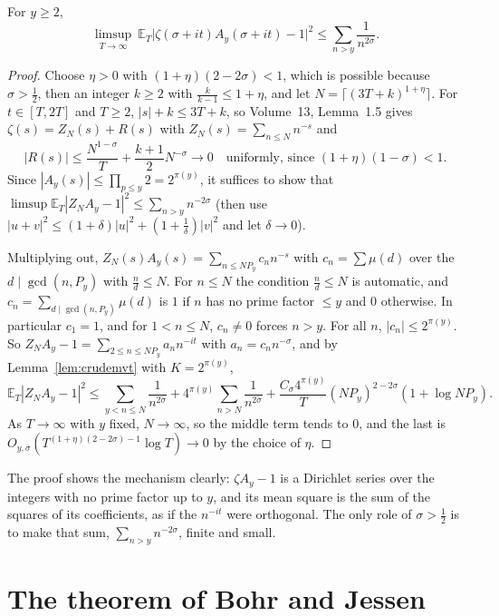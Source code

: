 \begin{proposition}\label{prop:mollified}
For $y\ge2$,
\[
\limsup_{T\to\infty}\ \mathbb E_T\bigl|\zeta(\sigma+it)A_y(\sigma+it)-1\bigr|^2\le\sum_{n>y}\frac1{n^{2\sigma}}.
\]
\end{proposition}
\begin{proof}
Choose $\eta>0$ with $(1+\eta)(2-2\sigma)<1$, which is possible because $\sigma>\frac12$, then an integer $k\ge2$ with $\frac k{k-1}\le1+\eta$, and let $N=\lceil(3T+k)^{1+\eta}\rceil$. For $t\in[T,2T]$ and $T\ge2$, $|s|+k\le3T+k$, so Volume~13, Lemma~1.5 gives $\zeta(s)=Z_N(s)+R(s)$ with $Z_N(s)=\sum_{n\le N}n^{-s}$ and
\[
|R(s)|\le\frac{N^{1-\sigma}}{T}+\frac{k+1}2N^{-\sigma}\longrightarrow0\quad\text{uniformly, since }(1+\eta)(1-\sigma)<1.
\]
Since $|A_y(s)|\le\prod_{p\le y}2=2^{\pi(y)}$, it suffices to show that $\limsup\mathbb E_T|Z_NA_y-1|^2\le\sum_{n>y}n^{-2\sigma}$ (then use $|u+v|^2\le(1+\delta)|u|^2+(1+\frac1\delta)|v|^2$ and let $\delta\to0$).

Multiplying out, $Z_N(s)A_y(s)=\sum_{n\le NP_y}c_nn^{-s}$ with $c_n=\sum\mu(d)$ over the $d\mid\gcd(n,P_y)$ with $\frac nd\le N$. For $n\le N$ the condition $\frac nd\le N$ is automatic, and $c_n=\sum_{d\mid\gcd(n,P_y)}\mu(d)$ is $1$ if $n$ has no prime factor $\le y$ and $0$ otherwise. In particular $c_1=1$, and for $1<n\le N$, $c_n\ne0$ forces $n>y$. For all $n$, $|c_n|\le2^{\pi(y)}$. So $Z_NA_y-1=\sum_{2\le n\le NP_y}a_nn^{-it}$ with $a_n=c_nn^{-\sigma}$, and by Lemma~\ref{lem:crudemvt} with $K=2^{\pi(y)}$,
\[
\mathbb E_T|Z_NA_y-1|^2\le\sum_{y<n\le N}\frac1{n^{2\sigma}}+4^{\pi(y)}\sum_{n>N}\frac1{n^{2\sigma}}+\frac{C_{\sigma}4^{\pi(y)}}T(NP_y)^{2-2\sigma}(1+\log NP_y).
\]
As $T\to\infty$ with $y$ fixed, $N\to\infty$, so the middle term tends to $0$, and the last is $O_{y,\sigma}(T^{(1+\eta)(2-2\sigma)-1}\log T)\to0$ by the choice of $\eta$.
\end{proof}

The proof shows the mechanism clearly: $\zeta A_y-1$ is a Dirichlet series over the integers with no prime factor up to $y$, and its mean square is the sum of the squares of its coefficients, as if the $n^{-it}$ were orthogonal. The only role of $\sigma>\frac12$ is to make that sum, $\sum_{n>y}n^{-2\sigma}$, finite and small.

\section{The theorem of Bohr and Jessen}

